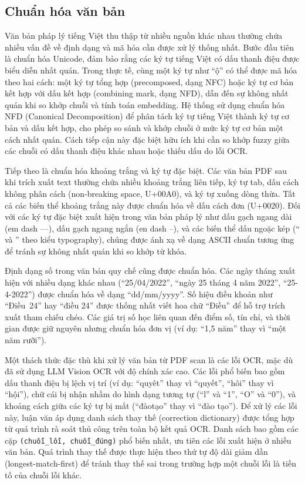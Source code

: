 \subsection{Chuẩn hóa văn bản}
\label{subsec:chuan-hoa-van-ban}

Văn bản pháp lý tiếng Việt thu thập từ nhiều nguồn khác nhau thường chứa nhiều
vấn đề về định dạng và mã hóa cần được xử lý thống nhất. Bước đầu tiên là chuẩn
hóa Unicode, đảm bảo rằng các ký tự tiếng Việt có dấu thanh điệu được biểu diễn
nhất quán. Trong thực tế, cùng một ký tự như ``ộ'' có thể được mã hóa theo hai
cách: một ký tự tổng hợp (precomposed, dạng NFC) hoặc ký tự cơ bản kết hợp với
dấu kết hợp (combining mark, dạng NFD), dẫn đến sự không nhất quán khi so khớp
chuỗi và tính toán embedding. Hệ thống sử dụng chuẩn hóa NFD (Canonical
Decomposition) để phân tách ký tự tiếng Việt thành ký tự cơ bản và dấu kết hợp,
cho phép so sánh và khớp chuỗi ở mức ký tự cơ bản một cách nhất quán. Cách tiếp
cận này đặc biệt hữu ích khi cần so khớp fuzzy giữa các chuỗi có dấu thanh điệu
khác nhau hoặc thiếu dấu do lỗi OCR.

Tiếp theo là chuẩn hóa khoảng trắng và ký tự đặc biệt. Các văn bản PDF sau khi
trích xuất text thường chứa nhiều khoảng trắng liên tiếp, ký tự tab, dấu cách
không phân cách (non-breaking space, U+00A0), và ký tự xuống dòng thừa. Tất cả
các biến thể khoảng trắng này được chuẩn hóa về dấu cách đơn (U+0020). Đối với
các ký tự đặc biệt xuất hiện trong văn bản pháp lý như dấu gạch ngang dài (em
dash ---), dấu gạch ngang ngắn (en dash --), và các biến thể dấu ngoặc kép (``
và '' theo kiểu typography), chúng được ánh xạ về dạng ASCII chuẩn tương ứng để
tránh sự không nhất quán khi so khớp từ khóa.

Định dạng số trong văn bản quy chế cũng được chuẩn hóa. Các ngày tháng xuất
hiện với nhiều dạng khác nhau (``25/04/2022'', ``ngày 25 tháng 4 năm 2022'',
``25-4-2022'') được chuẩn hóa về dạng ``dd/mm/yyyy''. Số hiệu điều khoản như
``Điều~24'' hay ``điều 24'' được thống nhất viết hoa chữ ``Điều'' để hỗ trợ
trích xuất tham chiếu chéo. Các giá trị số học liên quan đến điểm số, tín chỉ,
và thời gian được giữ nguyên nhưng chuẩn hóa đơn vị (ví dụ: ``1,5 năm'' thay
vì ``một năm rưỡi'').

Một thách thức đặc thù khi xử lý văn bản từ PDF scan là các lỗi OCR, mặc dù đã
sử dụng LLM Vision OCR với độ chính xác cao. Các lỗi phổ biến bao gồm dấu thanh
điệu bị lệch vị trí (ví dụ: ``quyêt'' thay vì ``quyết'', ``hôi'' thay vì
``hội''), chữ cái bị nhận nhầm do hình dạng tương tự (``l'' và ``1'', ``O'' và
``0''), và khoảng cách giữa các ký tự bị mất (``đàotạo'' thay vì ``đào tạo'').
Để xử lý các lỗi này, luận văn áp dụng danh sách thay thế (correction dictionary)
được tổng hợp từ quá trình rà soát thủ công trên toàn bộ kết quả OCR. Danh sách
bao gồm các cặp \texttt{(chuỗi\_lỗi, chuỗi\_đúng)} phổ biến nhất, ưu tiên các lỗi
xuất hiện ở nhiều văn bản. Quá trình thay thế được thực hiện theo thứ tự độ dài
giảm dần (longest-match-first) để tránh thay thế sai trong trường hợp một chuỗi
lỗi là tiền tố của chuỗi lỗi khác.

